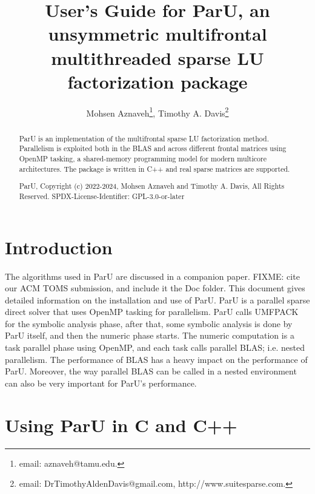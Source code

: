 \documentclass[12pt]{article}
\title{User's Guide for ParU, an unsymmetric multifrontal multithreaded sparse
LU factorization package}
\author{Mohsen Aznaveh\thanks{email: aznaveh@tamu.edu.},
Timothy A. Davis\thanks{email: DrTimothyAldenDavis@gmail.com,
http://www.suitesparse.com.}}
\begin{document}
\maketitle

\begin{abstract}

ParU is an implementation of the multifrontal sparse LU factorization method.
Parallelism is exploited both in the BLAS and across different frontal matrices
using OpenMP tasking, a shared-memory programming model for modern multicore
architectures. The package is written in C++ and real sparse matrices are
supported.

ParU, Copyright (c) 2022-2024, Mohsen Aznaveh and Timothy A. Davis,
All Rights Reserved.
SPDX-License-Identifier: GPL-3.0-or-later
\end{abstract}

\newpage
{\small
\tableofcontents
}

\section{Introduction}
\label{intro}

The algorithms used in ParU are discussed in a companion paper.
FIXME: cite our ACM TOMS submission, and include it the Doc folder.
This document gives detailed information on the installation and use of ParU.
ParU is a parallel sparse direct solver that uses OpenMP tasking for
parallelism. ParU calls UMFPACK for the symbolic analysis phase, after that,
some symbolic analysis is done by ParU itself, and then the numeric phase
starts. The numeric computation is a task parallel phase using OpenMP, and each
task calls parallel BLAS; i.e. nested parallelism.  The performance of BLAS has
a heavy impact on the performance of ParU. Moreover, the way parallel BLAS can
be called in a nested environment can also be very important for ParU's
performance.

\section{Using ParU in C and C++}
\end{document}
